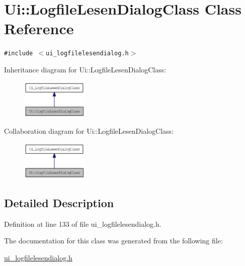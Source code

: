 \hypertarget{class_ui_1_1_logfile_lesen_dialog_class}{
\section{Ui::LogfileLesenDialogClass Class Reference}
\label{class_ui_1_1_logfile_lesen_dialog_class}
}
{\tt \#include $<$ui\_\-logfilelesendialog.h$>$}

Inheritance diagram for Ui::LogfileLesenDialogClass:\nopagebreak
\begin{figure}[H]
\begin{center}
\leavevmode
\includegraphics[width=90pt]{class_ui_1_1_logfile_lesen_dialog_class__inherit__graph}
\end{center}
\end{figure}
Collaboration diagram for Ui::LogfileLesenDialogClass:\nopagebreak
\begin{figure}[H]
\begin{center}
\leavevmode
\includegraphics[width=90pt]{class_ui_1_1_logfile_lesen_dialog_class__coll__graph}
\end{center}
\end{figure}


\subsection{Detailed Description}


Definition at line 133 of file ui\_\-logfilelesendialog.h.

The documentation for this class was generated from the following file:\begin{CompactItemize}
\item 
\hyperlink{ui__logfilelesendialog_8h}{ui\_\-logfilelesendialog.h}\end{CompactItemize}
